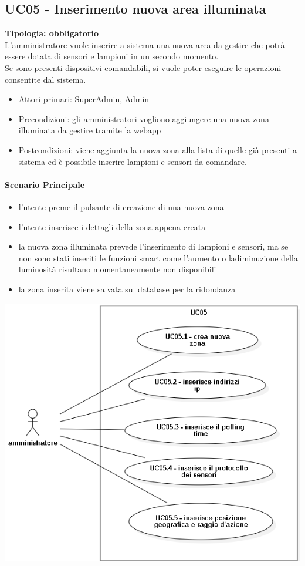\documentclass[12pt]{article}
\begin{document}
\subsection{UC05 - Inserimento nuova area illuminata}
\textbf{Tipologia: obbligatorio} \\
L'amministratore vuole inserire a sistema una nuova area da gestire che potrà essere dotata di sensori e lampioni in un secondo momento.\\
Se sono presenti dispositivi comandabili, si vuole poter eseguire le operazioni consentite dal sistema.
\begin{itemize}
	\item Attori primari: SuperAdmin, Admin
	\item Precondizioni: gli amministratori vogliono aggiungere una nuova zona illuminata da gestire tramite la webapp
	\item Postcondizioni: viene aggiunta la nuova zona alla lista di quelle già presenti a sistema ed è possibile inserire lampioni e sensori da comandare.
\end{itemize}
\paragraph{Scenario Principale}
\begin{itemize}
	\item l'utente preme il pulsante di creazione di una nuova zona
	\item l'utente inserisce i dettagli della zona appena creata
	\item la nuova zona illuminata prevede l'inserimento di lampioni e sensori, ma se non sono stati inseriti le funzioni smart come l'aumento o ladiminuzione della luminosità risultano momentaneamente non disponibili
	\item la zona inserita viene salvata sul database per la ridondanza
\end{itemize}

\includegraphics[scale=0.5]{UC05.png}
\end{document}
